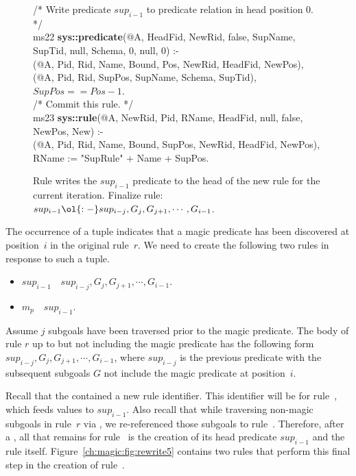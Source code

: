 \begin{figure}[!t]
\ssp
\centering
\begin{boxedminipage}{\linewidth}
/* Write predicate $sup_{i-1}$ to predicate relation in head position $0$. */ \\
ms22 {\bf sys::predicate}(@A, HeadFid, NewRid, false, SupName, SupTid, null, Schema, 0, null, 0) :- \\
(@A, Pid, Rid, Name, Bound, Pos, NewRid, HeadFid, NewPos), \\
(@A, Pid, Rid, SupPos, SupName, Schema, SupTid), \\
\datalogspace $SupPos == Pos - 1$. \\
  
/* Commit this rule. */ \\
ms23 {\bf sys::rule}(@A, NewRid, Pid, RName, HeadFid, null, false, NewPos, New) :- \\
(@A, Pid, Rid, Name, Bound, SupPos, NewRid, HeadFid, NewPos), \\
\datalogspace RName := "SupRule" + Name + SupPos. \\

\end{boxedminipage}
\caption{\label{ch:evita:fig:supiter} Rule writes the $sup_{i-1}$ predicate to the head 
of the new rule for the current iteration.
Finalize rule: $sup_{i-1} \ol{:-} sup_{i-j}, G_j, G_{j+1}, \cdots, G_{i-1}$.}
\end{figure}

The occurrence of a  tuple indicates that a magic predicate has been
discovered at position~$i$ in the original rule~$r$.  We need to create the following
two rules in response to such a  tuple.
\begin{itemize}
  \ssp
  \item {} $sup_{i-1}$~\ol{:-}~$sup_{i-j}, G_j, G_{j+1}, \cdots, G_{i-1}$.
  \item {} $m_p$~\ol{:-}~$sup_{i-1}$.
\end{itemize}
Assume $j$ subgoals have been traversed prior to the magic predicate.  The body
of rule $r$ up to but not including the magic predicate has the following form
$sup_{i-j}, G_j, G_{j+1}, \cdots, G_{i-1}$, where $sup_{i-j}$ is the previous
 predicate with the subsequent subgoals $G$ not include the magic
predicate at position~$i$.  

Recall that the  contained a new rule identifier.  This identifier
will be for rule~, which feeds values to $sup_{i-1}$.  Also recall that
while traversing non-magic subgoals in rule~$r$ via , we re-referenced
those subgoals to rule~. Therefore, after a , all that remains 
for rule~ is the creation of its head predicate $sup_{i-1}$ and the rule
itself. Figure~\ref{ch:magic:fig:rewrite5} contains two rules that perform this
final step in the creation of rule~. 

